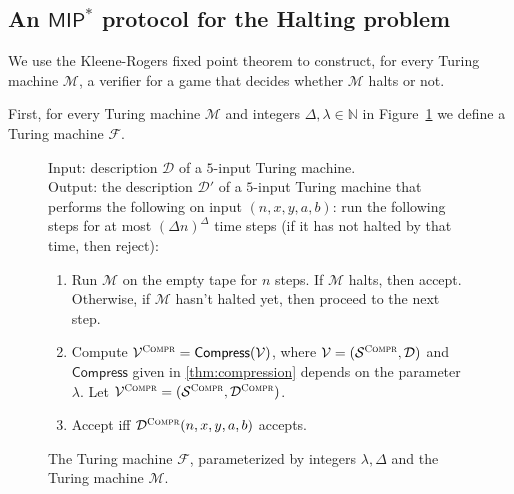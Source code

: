 \documentclass[11pt]{article}
\theoremstyle{definition}
\newcommand{\N}{\ensuremath{\mathbb{N}}}
\newcommand{\sampler}{\mathcal{S}}
\newcommand{\decider}{\mathcal{D}}
\newcommand{\verifier}{\mathcal{V}}
\newcommand{\compr}{\textsc{Compr}}
\newcommand{\machine}{\cal{M}}
\renewcommand{\cal}[1]{\mathcal{#1}}
\newcommand{\tmstyle}[1]{\ensuremath{\mathsf{#1}}}
\newcommand{\Compress}{\tmstyle{Compress}}
\newenvironment{gamespec}{
  \begin{mdframed}[style=figstyle]}{
  \end{mdframed}}
\begin{document}
\subsection{An $\mathsf{MIP}^*$ protocol for the Halting problem}
\label{sec:halt}

We use the Kleene-Rogers fixed point theorem to construct, for every Turing
machine $\cal{M}$, a verifier for a game that decides whether $\cal{M}$ halts or
not.

First, for every Turing machine $\cal{M}$ and integers $\Delta, \lambda \in \N$
in Figure~\ref{fig:halt_f} we define a Turing machine $\cal{F}$.

\begin{figure}[H]
  \centering
  \begin{gamespec}
  	Input: description $\decider$ of a $5$-input Turing machine.
    \\[9pt]
    Output: the description $\decider'$ of a $5$-input Turing machine that
    performs the following on input $(n,x,y,a,b)$: run the following steps for
    at most $(\Delta n)^\Delta$ time steps (if it has not halted by that time,
    then reject):
    \begin{enumerate}
    \item Run $\machine$ on the empty tape for $n$ steps.
      If $\machine$ halts, then accept.
      Otherwise, if $\machine$ hasn't halted yet, then proceed to the next step.
    \item Compute $\verifier^\compr = \Compress(\verifier)$, where $\verifier =
      (\sampler^\compr, \decider)$ and $\Compress$ given in
      \cref{thm:compression} depends on the parameter $\lambda$.
      Let $\verifier^\compr = (\sampler^\compr, \decider^\compr)$.
    \item Accept iff $\decider^\compr(n,x,y,a,b)$ accepts.
    \end{enumerate}
  \end{gamespec}
  \caption{The Turing machine $\cal{F}$, parameterized by integers
    $\lambda,\Delta$ and the Turing machine $\cal{M}$.}
  \label{fig:halt_f}
\end{figure}
\end{document}
